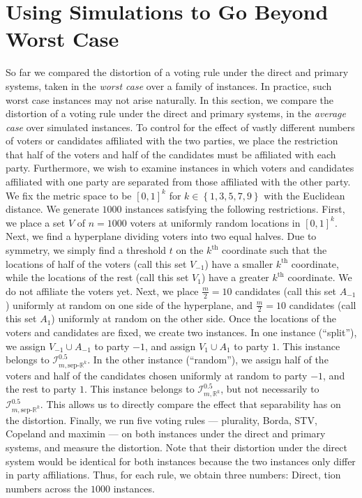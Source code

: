 \documentclass[letterpaper]{article} %
\theoremstyle{definition}
\newcommand{\set}[1]{\left\{#1\right\}}
\newcommand{\bbR}{\mathbb{R}}
\newcommand{\calI}{\mathcal{I}}
\newcommand{\pleft}{-1}
\newcommand{\pright}{1}
\newcommand{\sep}{\textrm{sep-}}
\newcommand{\euc}[1]{\bbR^{#1}}
\newcommand{\eucsep}[1]{\sep\euc{#1}}
\newcommand{\I}{\calI}
\begin{document}
\section{Using Simulations to Go Beyond Worst Case}
So far we compared the distortion of a voting rule under the direct and primary systems, taken in the \emph{worst case} over a family of instances. In practice, such worst case instances may not arise naturally. In this section, we compare the distortion of a voting rule under the direct and primary systems, in the \emph{average case} over simulated instances. To control for the effect of vastly different numbers of voters or candidates affiliated with the two parties, we place the restriction that half of the voters and half of the candidates must be affiliated with each party. Furthermore, we wish to examine instances in which voters and candidates affiliated with one party are separated from those affiliated with the other party.
We fix the metric space to be $[0,1]^k$ for $k \in \set{1,3,5,7,9}$ with the Euclidean distance. We generate $1000$ instances satisfying the following restrictions. First, we place a set $V$ of $n = 1000$ voters at uniformly random locations in $[0,1]^k$. Next, we find a hyperplane dividing voters into two equal halves. Due to symmetry, we simply find a threshold $t$ on the $k^{\text{th}}$ coordinate such that the locations of half of the voters (call this set $V_{\pleft}$) have a smaller $k^{\text{th}}$ coordinate, while the locations of the rest (call this set $V_{\pright}$) have a greater $k^{\text{th}}$ coordinate. We do not affiliate the voters yet. Next, we place $\frac{m}{2} = 10$ candidates (call this set $A_{\pleft}$) uniformly at random on one side of the hyperplane,  and $\frac{m}{2} = 10$ candidates (call this set $A_{\pright}$) uniformly at random on the other side.
Once the locations of the voters and candidates are fixed, we create two instances. In one instance (``split''), we assign $V_{\pleft} \cup A_{\pleft}$ to party $\pleft$, and assign $V_{\pright} \cup A_{\pright}$ to party $\pright$. This instance belongs to $\I^{0.5}_{m,\eucsep{k}}$. In the other instance (``random''), we assign half of the voters and half of the candidates chosen uniformly at random to party $\pleft$, and the rest to party $\pright$. This instance belongs to $\I^{0.5}_{m,\euc{k}}$, but not necessarily to $\I^{0.5}_{m,\eucsep{k}}$. This allows us to directly compare the effect that separability has on the distortion. Finally, we run five voting rules --- plurality, Borda, STV, Copeland and maximin --- on both instances under the direct and primary systems, and measure the distortion. Note that their distortion under the direct system would be identical for both instances because the two instances only differ in party affiliations. Thus, for each rule, we obtain three numbers: Direct, tion numbers across the $1000$ instances.
\end{document}
